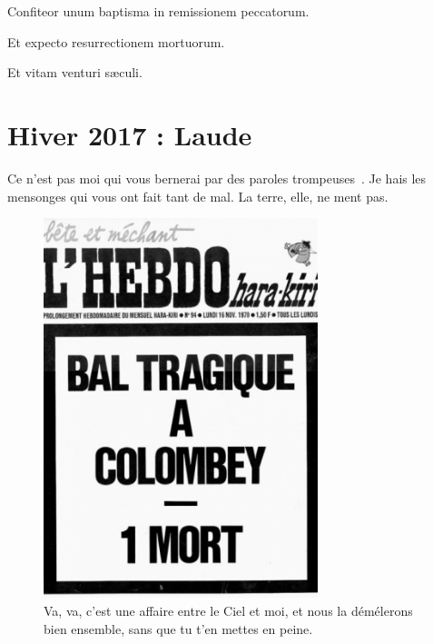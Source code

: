 \documentclass[a4paper,footinbib,final,openany,final,12pt]{book}
\begin{document}












Confiteor unum baptisma in remissionem peccatorum.

Et expecto resurrectionem mortuorum.

Et vitam venturi s{\ae}culi.

\section{Hiver 2017 : Laude}

Ce n'est pas moi qui vous bernerai par des paroles trompeuses~\cite{Foucault}. Je hais les mensonges qui vous ont fait tant de mal. La terre, elle, ne ment pas.

\begin{figure}[!htb]
\begin{center}
\includegraphics[width=8cm]{Fig04}
\caption{Va, va, c'est une affaire entre le Ciel et moi, et nous la d{\'{e}}m{\'{e}}lerons bien ensemble, sans que tu t'en mettes en peine.}
\label{Fig4}
\end{center}
\end{figure}
\end{document}
